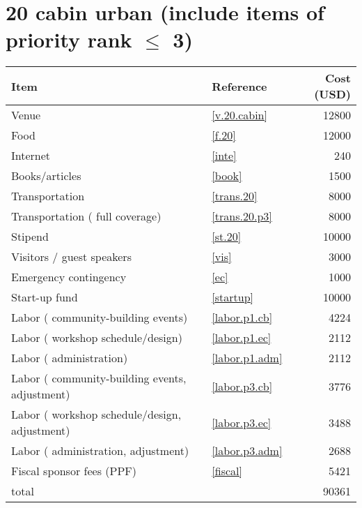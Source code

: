 \section*{20 cabin urban (include items of priority rank $\leq$ 3)}
\begin{center}
\begin{tabular}{llr}
Item & Reference & Cost (USD) \\ \hline
Venue & \ref{v.20.cabin} & 12800 \\
Food & \ref{f.20} & 12000 \\
Internet & \ref{inte} & 240 \\
Books/articles & \ref{book} & 1500 \\
Transportation & \ref{trans.20} & 8000 \\
Transportation ( full coverage) & \ref{trans.20.p3} & 8000 \\
Stipend & \ref{st.20} & 10000 \\
Visitors / guest speakers & \ref{vis} & 3000 \\
Emergency contingency & \ref{ec} & 1000 \\
Start-up fund & \ref{startup} & 10000 \\
Labor ( community-building events) & \ref{labor.p1.cb} & 4224 \\
Labor ( workshop schedule/design) & \ref{labor.p1.ec} & 2112 \\
Labor ( administration) & \ref{labor.p1.adm} & 2112 \\
Labor ( community-building events, adjustment) & \ref{labor.p3.cb} & 3776 \\
Labor ( workshop schedule/design, adjustment) & \ref{labor.p3.ec} & 3488 \\
Labor ( administration, adjustment) & \ref{labor.p3.adm} & 2688 \\
Fiscal sponsor fees (PPF) & \ref{fiscal} & 5421 \\ \hline
total &  & 90361
\end{tabular}
\end{center}
\newpage
